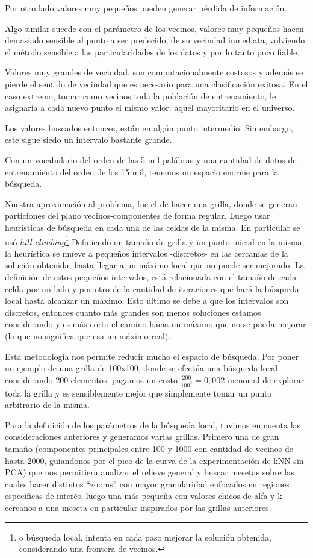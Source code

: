 Por otro lado valores muy pequeños pueden generar pérdida de información.

Algo similar sucede con el parámetro de los vecinos, valores muy
pequeños hacen demasiado sensible al punto a ser predecido, de su
vecindad inmediata, volviendo el método sensible a las
particularidades de los datos y por lo tanto poco fiable.

Valores muy grandes de vecindad, son computacionalmente costosos y
además se pierde el sentido de vecindad que es necesario para una
clasificación exitosa. En el caso extremo, tomar como vecinos toda la
población de entrenamiento, le asignaría a cada nuevo punto el mismo
valor: aquel mayoritario en el universo.

Los valores buscados entonces, están en algún punto intermedio. Sin
embargo, este sigue siedo un intervalo bastante grande.

Con un vocabulario del orden de las 5 mil palábras y una cantidad de
datos de entrenamiento del orden de los 15 mil, tenemos un espacio
enorme para la búsqueda.

Nuestra aproximación al problema, fue el de hacer una grilla, donde se
generan particiones del plano vecinos-componentes de forma
regular. Luego usar heurísticas de búsqueda en cada una de las celdas
de la misma. En particular se usó \emph{hill
  climbing}\cite{aima}\footnote{o búsqueda local, intenta en cada paso
  mejorar la solución obtenida, considerando una frontera de vecinos.}
Definiendo un tamaño de grilla y un punto inicial en la misma, la
heurística se mueve a pequeños intervalos -discretos- en las cercanías
de la solución obtenida, hasta llegar a un máximo local que no puede
ser mejorado. La definición de estos pequeños intervalos, está
relacionada con el tamaño de cada celda por un lado y por otro de la
cantidad de iteraciones que hará la búsqueda local hasta alcanzar un
máximo. Esto último se debe a que los intervalos son discretos,
entonces cuanto más grandes son menos soluciones estamos considerando
y es más corto el camino hacía un máximo que no se pueda mejorar (lo
que no significa que esa un máximo real).

Esta metodología nos permite reducir mucho el espacio de búsqueda. Por
poner un ejemplo de una grilla de 100x100, donde se efectúa una
búsqueda local considerando 200 elementos, pagamos un costo
$\frac{200}{100^2} = 0,002$ menor al de explorar toda la grilla y es
sensiblemente mejor que simplemente tomar un punto arbitrario de la
misma.

Para la definición de los parámetros de la búsqueda local, tuvimos en
cuenta las consideraciones anteriores y generamos varias grillas. Primero una
de gran tamaño (componentes principales entre 100 y 1000 con cantidad de vecinos de hasta 2000, guiandonos por el pico de la curva de la experimentación de kNN sin PCA) que nos permitiera analizar el relieve general y buscar mesetas sobre las cuales hacer distintos ``zooms'' con mayor granularidad enfocados en regiones específicas de interés, luego una más pequeña con valores chicos de alfa y k cercanos a una meseta en particular inspirados por las grillas anteriores.

